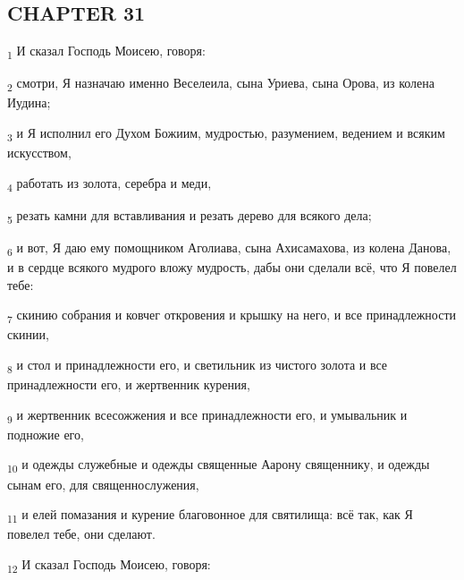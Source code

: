 \subsection{CHAPTER 31}
\begin{tcolorbox}
\textsubscript{1} И сказал Господь Моисею, говоря:
\end{tcolorbox}
\begin{tcolorbox}
\textsubscript{2} смотри, Я назначаю именно Веселеила, сына Уриева, сына Орова, из колена Иудина;
\end{tcolorbox}
\begin{tcolorbox}
\textsubscript{3} и Я исполнил его Духом Божиим, мудростью, разумением, ведением и всяким искусством,
\end{tcolorbox}
\begin{tcolorbox}
\textsubscript{4} работать из золота, серебра и меди,
\end{tcolorbox}
\begin{tcolorbox}
\textsubscript{5} резать камни для вставливания и резать дерево для всякого дела;
\end{tcolorbox}
\begin{tcolorbox}
\textsubscript{6} и вот, Я даю ему помощником Аголиава, сына Ахисамахова, из колена Данова, и в сердце всякого мудрого вложу мудрость, дабы они сделали всё, что Я повелел тебе:
\end{tcolorbox}
\begin{tcolorbox}
\textsubscript{7} скинию собрания и ковчег откровения и крышку на него, и все принадлежности скинии,
\end{tcolorbox}
\begin{tcolorbox}
\textsubscript{8} и стол и принадлежности его, и светильник из чистого золота и все принадлежности его, и жертвенник курения,
\end{tcolorbox}
\begin{tcolorbox}
\textsubscript{9} и жертвенник всесожжения и все принадлежности его, и умывальник и подножие его,
\end{tcolorbox}
\begin{tcolorbox}
\textsubscript{10} и одежды служебные и одежды священные Аарону священнику, и одежды сынам его, для священнослужения,
\end{tcolorbox}
\begin{tcolorbox}
\textsubscript{11} и елей помазания и курение благовонное для святилища: всё так, как Я повелел тебе, они сделают.
\end{tcolorbox}
\begin{tcolorbox}
\textsubscript{12} И сказал Господь Моисею, говоря:
\end{tcolorbox}
